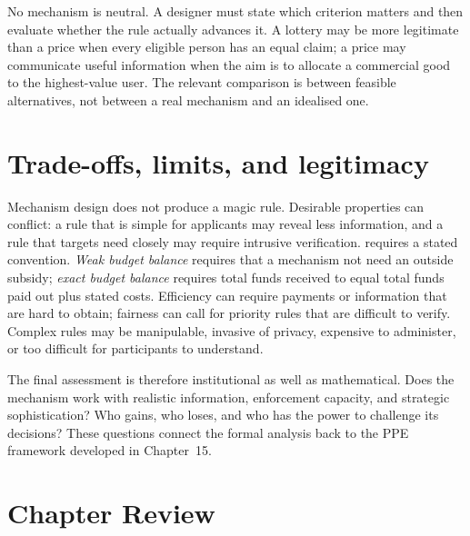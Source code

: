 No mechanism is neutral. A designer must state which criterion matters and
then evaluate whether the rule actually advances it. A lottery may be more
legitimate than a price when every eligible person has an equal claim; a price
may communicate useful information when the aim is to allocate a commercial
good to the highest-value user. The relevant comparison is between feasible
alternatives, not between a real mechanism and an idealised one.

\section{Trade-offs, limits, and legitimacy}

Mechanism design does not produce a magic rule. Desirable properties can
conflict: a rule that is simple for applicants may reveal less information, and
a rule that targets need closely may require intrusive verification.
 requires a stated convention. \emph{Weak
budget balance} requires that a mechanism not need an outside subsidy; \emph{
exact budget balance} requires total funds received to equal total funds paid
out plus stated costs. Efficiency can require payments or information that are
hard to obtain; fairness can call for priority rules that are difficult to
verify. Complex rules may be manipulable, invasive of privacy, expensive to
administer, or too difficult for participants to understand.

The final assessment is therefore institutional as well as mathematical. Does
the mechanism work with realistic information, enforcement capacity, and
strategic sophistication? Who gains, who loses, and who has the power to
challenge its decisions? These questions connect the formal analysis back to
the PPE framework developed in Chapter~15.

\section*{Chapter Review}

